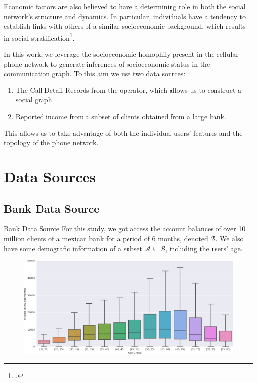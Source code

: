 \documentclass{beamer}
\newcommand{\mathA}{\mathcal{A}}
\newcommand{\mathB}{\mathcal{B}}
\begin{document}
\begin{frame}
Economic factors are also believed to have a determining role in both the social network’s structure and dynamics. In particular, individuals have a tendency to establish links with others of a similar socioeconomic background, which results in social stratification\footcite{leo2015socioeconomic}.

\pause{}

In this work, we leverage the socioeconomic homophily present in the cellular phone network to generate inferences of socioeconomic status in the communication graph. To this aim we use two data sources:
\begin{enumerate}
	\item The Call Detail Records from the operator, which allows us to construct a social graph.
	\item Reported income from a subset of clients obtained from a large bank.
\end{enumerate}

This allows us to take advantage of both the individual users' features and the topology of the phone network.

\end{frame}

\section{Data Sources}
\subsection{Bank Data Source}

\begin{frame}{Bank Data Source}
For this study, we got access the account balances of over 10 million clients of a mexican bank for a period of 6 months, denoted \( \mathB \). We also have some demografic information of a subset \( \mathA \subseteq \mathB \), including the users' age.

\begin{figure}[h]
	\begin{center}
		{\includegraphics[width=\columnwidth]
				{income_age_boxplot4_wide.png}
		}\label{income_age_boxplot}
	\end{center}
\end{figure}
\end{frame}
\end{document}

